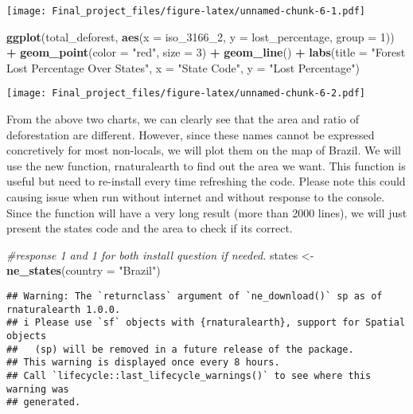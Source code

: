 \documentclass[
]{article}
\newenvironment{Shaded}{\begin{snugshade}}{\end{snugshade}}
\newcommand{\AttributeTok}[1]{\textcolor[rgb]{0.13,0.29,0.53}{#1}}
\newcommand{\CommentTok}[1]{\textcolor[rgb]{0.56,0.35,0.01}{\textit{#1}}}
\newcommand{\DecValTok}[1]{\textcolor[rgb]{0.00,0.00,0.81}{#1}}
\newcommand{\FunctionTok}[1]{\textcolor[rgb]{0.13,0.29,0.53}{\textbf{#1}}}
\newcommand{\NormalTok}[1]{#1}
\newcommand{\OtherTok}[1]{\textcolor[rgb]{0.56,0.35,0.01}{#1}}
\newcommand{\SpecialCharTok}[1]{\textcolor[rgb]{0.81,0.36,0.00}{\textbf{#1}}}
\newcommand{\StringTok}[1]{\textcolor[rgb]{0.31,0.60,0.02}{#1}}
\begin{document}
\texttt{[image: Final\_project\_files/figure-latex/unnamed-chunk-6-1.pdf]}

\begin{Shaded}
\begin{Highlighting}[]
\FunctionTok{ggplot}\NormalTok{(total\_deforest, }\FunctionTok{aes}\NormalTok{(}\AttributeTok{x =}\NormalTok{ iso\_3166\_2, }\AttributeTok{y =}\NormalTok{ lost\_percentage, }\AttributeTok{group =} \DecValTok{1}\NormalTok{)) }\SpecialCharTok{+}
  \FunctionTok{geom\_point}\NormalTok{(}\AttributeTok{color =} \StringTok{"red"}\NormalTok{, }\AttributeTok{size =} \DecValTok{3}\NormalTok{) }\SpecialCharTok{+}
  \FunctionTok{geom\_line}\NormalTok{() }\SpecialCharTok{+}
  \FunctionTok{labs}\NormalTok{(}\AttributeTok{title =} \StringTok{"Forest Lost Percentage Over States"}\NormalTok{, }\AttributeTok{x =} \StringTok{"State Code"}\NormalTok{, }\AttributeTok{y =} \StringTok{"Lost Percentage"}\NormalTok{)}
\end{Highlighting}
\end{Shaded}

\texttt{[image: Final\_project\_files/figure-latex/unnamed-chunk-6-2.pdf]}

From the above two charts, we can clearly see that the area and ratio of
deforestation are different. However, since these names cannot be
expressed concretively for most non-locals, we will plot them on the map
of Brazil. We will use the new function, rnaturalearth to find out the
area we want. This function is useful but need to re-install every time
refreshing the code. Please note this could causing issue when run
without internet and without response to the console. Since the function
will have a very long result (more than 2000 lines), we will just
present the states code and the area to check if its correct.

\begin{Shaded}
\begin{Highlighting}[]
\CommentTok{\#response \textquotesingle{}1\textquotesingle{} and \textquotesingle{}1\textquotesingle{} for both install question if needed.}
\NormalTok{states }\OtherTok{\textless{}{-}} \FunctionTok{ne\_states}\NormalTok{(}\AttributeTok{country =} \StringTok{"Brazil"}\NormalTok{)}
\end{Highlighting}
\end{Shaded}

\begin{verbatim}
## Warning: The `returnclass` argument of `ne_download()` sp as of rnaturalearth 1.0.0.
## i Please use `sf` objects with {rnaturalearth}, support for Spatial objects
##   (sp) will be removed in a future release of the package.
## This warning is displayed once every 8 hours.
## Call `lifecycle::last_lifecycle_warnings()` to see where this warning was
## generated.
\end{verbatim}
\end{document}
